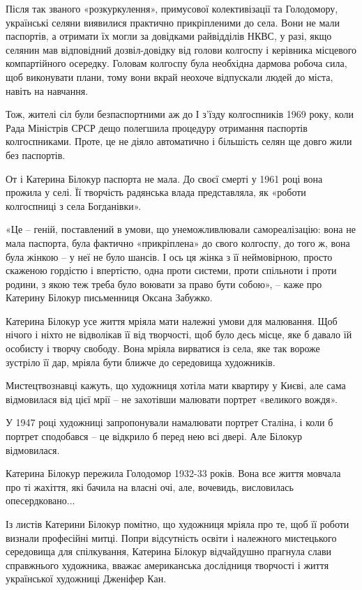 Після так званого «розкуркулення», примусової колективізації та Голодомору,
українські селяни виявилися практично прикріпленими до села. Вони не мали
паспортів, а отримати їх могли за довідками райвідділів НКВС, у разі, якщо
селянин мав відповідний дозвіл-довідку від голови колгоспу і керівника
місцевого компартійного осередку. Головам колгоспу була необхідна дармова
робоча сила, щоб виконувати плани, тому вони вкрай неохоче відпускали людей до
міста, навіть на навчання.

Тож, жителі сіл були безпаспортними аж до І з’їзду колгоспників 1969 року, коли
Рада Міністрів СРСР дещо полегшила процедуру отримання паспортів колгоспниками.
Проте, це не діяло автоматично і більшість селян ще довго жили без паспортів.

От і Катерина Білокур паспорта не мала. До своєї смерті у 1961 році вона
прожила у селі. Її творчість радянська влада представляла, як «роботи
колгоспниці з села Богданівки».

«Це – геній, поставлений в умови, що унеможливлювали самореалізацію: вона не
мала паспорта, була фактично «прикріплена» до свого колгоспу, до того ж, вона
була жінкою – у неї не було шансів. І ось ця жінка з її неймовірною, просто
скаженою гордістю і впертістю, одна проти системи, проти спільноти і проти
родини, з якою теж треба було воювати за право бути собою», – каже про Катерину
Білокур письменниця Оксана Забужко.


Катерина Білокур усе життя мріяла мати належні умови для малювання. Щоб нічого
і ніхто не відволікав її від творчості, щоб було десь місце, яке б давало їй
особисту і творчу свободу. Вона мріяла вирватися із села, яке так вороже
зустріло її дар, мріяла бути ближче до середовища художників.

Мистецтвознавці кажуть, що художниця хотіла мати квартиру у Києві, але сама
відмовилася від цієї мрії – не захотівши малювати портрет «великого вождя».

У 1947 році художниці запропонували намалювати портрет Сталіна, і коли б
портрет сподобався – це відкрило б перед нею всі двері. Але Білокур
відмовилася.

Катерина Білокур пережила Голодомор 1932-33 років. Вона все життя мовчала про
ті жахіття, які бачила на власні очі, але, вочевидь, висловилась
опесердковано...


Із листів Катерини Білокур помітно, що художниця мріяла про те, щоб її роботи
визнали професійні митці. Попри відсутність освіти і належного мистецького
середовища для спілкування, Катерина Білокур відчайдушно прагнула слави
справжнього художника, вважає американська дослідниця творчості і життя
української художниці Дженіфер Кан.

